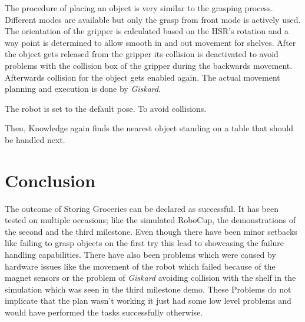 \documentclass[main.tex]{subfiles}
\begin{document}
	The procedure of placing an object is very similar to the grasping process. Different modes are available but only the grasp from front mode is actively used. The orientation of the gripper is calculated based on the HSR's rotation and a way point is determined to allow smooth in and  out movement for shelves. After the object gets released from the gripper its collision is deactivated to avoid problems with the collision box of the gripper during the backwards movement. Afterwards collision for the object gets enabled again. The actual movement planning and execution is done by \textit{Giskard}.   	
	
	
	The robot is set to the default pose. To avoid collisions.
	
	
	Then, Knowledge again finds the nearest object standing on a table that should be handled next.
	
	
	
	
	\section{Conclusion}

	The outcome of Storing Groceries can be declared as successful. It has been tested on multiple occasions; like the simulated RoboCup, the demonstrations of the second and the third milestone. 
	Even though there have been minor setbacks like failing to grasp objects on the first try this lead to showcasing the failure handling capabilities.
	There have also been problems which were caused by hardware issues like the movement of the robot which failed because of the magnet sensors or the problem of \textit{Giskard} avoiding collision with the shelf in the simulation which was seen in the third milestone demo.
	These Problems do not implicate that the plan wasn't working it just had some low level problems and would have performed the tasks successfully otherwise.
	
	
	\endgroup
	
\end{document}
